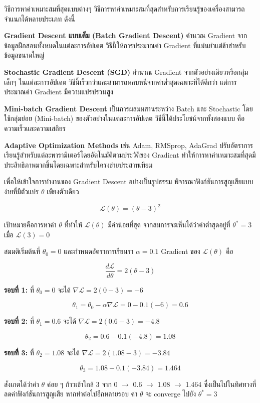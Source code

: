 \begin{myBox}[]{วิธีการหาค่าเหมาะสมที่สุดแบบต่างๆ}{}
วิธีการหาค่าเหมาะสมที่สุดสำหรับการเรียนรู้ของเครื่องสามารถจำแนกได้หลายประเภท ดังนี้

\textbf{Gradient Descent แบบเต็ม (Batch Gradient Descent)} คำนวณ Gradient จากข้อมูลฝึกสอนทั้งหมดในแต่ละการอัปเดต วิธีนี้ให้การประมาณค่า Gradient ที่แม่นยำแต่ช้าสำหรับข้อมูลขนาดใหญ่

\textbf{Stochastic Gradient Descent (SGD)} คำนวณ Gradient จากตัวอย่างเดียวหรือกลุ่มเล็กๆ ในแต่ละการอัปเดต วิธีนี้เร็วกว่าและสามารถหลบหนีจากค่าต่ำสุดเฉพาะที่ได้ดีกว่า แต่การประมาณค่า Gradient มีความแปรปรวนสูง

\textbf{Mini-batch Gradient Descent} เป็นการผสมผสานระหว่าง Batch และ Stochastic โดยใช้กลุ่มย่อย (Mini-batch) ของตัวอย่างในแต่ละการอัปเดต วิธีนี้ได้ประโยชน์จากทั้งสองแบบ คือความเร็วและความเสถียร

\textbf{Adaptive Optimization Methods} เช่น Adam, RMSprop, AdaGrad ปรับอัตราการเรียนรู้สำหรับแต่ละพารามิเตอร์โดยอัตโนมัติตามประวัติของ Gradient ทำให้การหาค่าเหมาะสมที่สุดมีประสิทธิภาพมากขึ้นโดยเฉพาะสำหรับโครงข่ายประสาทเทียม
\end{myBox}

\begin{exmp}
\label{exmp:gradient_descent_simple}
เพื่อให้เข้าใจการทำงานของ Gradient Descent อย่างเป็นรูปธรรม พิจารณาฟังก์ชันการสูญเสียแบบง่ายที่มีตัวแปร $\theta$ เพียงตัวเดียว

\[
\mathcal{L}(\theta) = (\theta - 3)^2
\]

เป้าหมายคือการหาค่า $\theta$ ที่ทำให้ $\mathcal{L}(\theta)$ มีค่าน้อยที่สุด จากสมการจะเห็นได้ว่าค่าต่ำสุดอยู่ที่ $\theta^* = 3$ เมื่อ $\mathcal{L}(3) = 0$

สมมติเริ่มต้นที่ $\theta_0 = 0$ และกำหนดอัตราการเรียนรา $\alpha = 0.1$ Gradient ของ $\mathcal{L}(\theta)$ คือ

\[
\frac{d\mathcal{L}}{d\theta} = 2(\theta - 3)
\]

\textbf{รอบที่ 1:} ที่ $\theta_0 = 0$ จะได้ $\nabla\mathcal{L} = 2(0-3) = -6$

\[
\theta_1 = \theta_0 - \alpha \nabla\mathcal{L} = 0 - 0.1(-6) = 0.6
\]

\textbf{รอบที่ 2:} ที่ $\theta_1 = 0.6$ จะได้ $\nabla\mathcal{L} = 2(0.6-3) = -4.8$

\[
\theta_2 = 0.6 - 0.1(-4.8) = 1.08
\]

\textbf{รอบที่ 3:} ที่ $\theta_2 = 1.08$ จะได้ $\nabla\mathcal{L} = 2(1.08-3) = -3.84$

\[
\theta_3 = 1.08 - 0.1(-3.84) = 1.464
\]

สังเกตได้ว่าค่า $\theta$ ค่อย ๆ ก้าวเข้าใกล้ 3 จาก 0 $\to$ 0.6 $\to$ 1.08 $\to$ 1.464 ซึ่งเป็นไปในทิศทางที่ลดค่าฟังก์ชันการสูญเสีย หากทำต่อไปอีกหลายรอบ ค่า $\theta$ จะ converge ไปยัง $\theta^* = 3$
\end{exmp}

